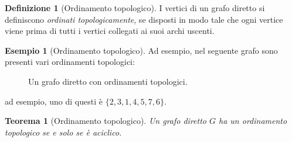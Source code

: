 \documentclass[14pt]{extreport}
\newtheorem{theorem}{Teorema}[subsection]
\theoremstyle{definition}
\newtheorem{definition}{Definizione}[subsection]
\theoremstyle{definition}
\newtheorem{example}{Esempio}[subsection]
\begin{document}
\begin{definition}[Ordinamento topologico]
    I vertici di un grafo diretto si definiscono \textit{ordinati topologicamente}, se disposti in modo tale che ogni vertice viene prima di tutti i vertici collegati ai suoi archi uscenti.
\end{definition}

\begin{example}[Ordinamento topologico]
    Ad esempio, nel seguente grafo sono presenti vari ordinamenti topologici:

    \begin{figure}[H]
        \centering
        \caption{Un grafo diretto con ordinamenti topologici.}
    \end{figure}

    ad esempio, uno di questi è $\{2, 3, 1, 4, 5, 7, 6\}$.
\end{example}

\begin{theorem}[Ordinamento topologico]
    \label{Ordinamento topologico}
    Un grafo diretto $G$ ha un ordinamento topologico se e solo se è aciclico.
\end{theorem}
\end{document}
